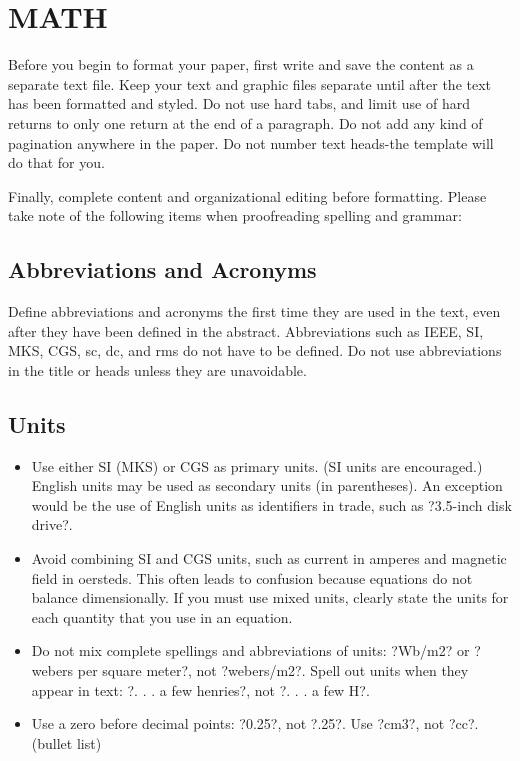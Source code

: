 \documentclass[letterpaper, 10 pt, conference]{ieeeconf}  %
\begin{document}
\section{MATH}

Before you begin to format your paper, first write and save the content as a separate text file. Keep your text and graphic files separate until after the text has been formatted and styled. Do not use hard tabs, and limit use of hard returns to only one return at the end of a paragraph. Do not add any kind of pagination anywhere in the paper. Do not number text heads-the template will do that for you.

Finally, complete content and organizational editing before formatting. Please take note of the following items when proofreading spelling and grammar:

\subsection{Abbreviations and Acronyms} Define abbreviations and acronyms the first time they are used in the text, even after they have been defined in the abstract. Abbreviations such as IEEE, SI, MKS, CGS, sc, dc, and rms do not have to be defined. Do not use abbreviations in the title or heads unless they are unavoidable.

\subsection{Units}

\begin{itemize}

\item Use either SI (MKS) or CGS as primary units. (SI units are encouraged.) English units may be used as secondary units (in parentheses). An exception would be the use of English units as identifiers in trade, such as ?3.5-inch disk drive?.
\item Avoid combining SI and CGS units, such as current in amperes and magnetic field in oersteds. This often leads to confusion because equations do not balance dimensionally. If you must use mixed units, clearly state the units for each quantity that you use in an equation.
\item Do not mix complete spellings and abbreviations of units: ?Wb/m2? or ?webers per square meter?, not ?webers/m2?.  Spell out units when they appear in text: ?. . . a few henries?, not ?. . . a few H?.
\item Use a zero before decimal points: ?0.25?, not ?.25?. Use ?cm3?, not ?cc?. (bullet list)

\end{itemize}
\end{document}
